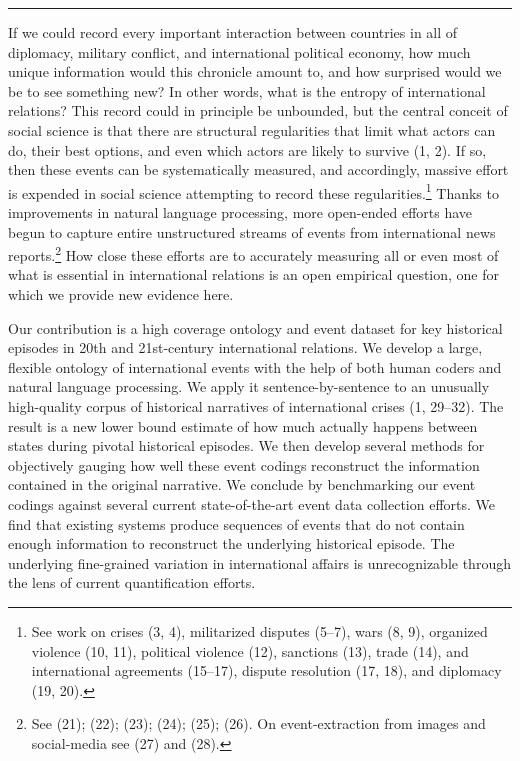 \documentclass{article}
\begin{document}
\begin{center}\rule{0.5\linewidth}{0.5pt}\end{center}

If we could record every important interaction between countries in all
of diplomacy, military conflict, and international political economy,
how much unique information would this chronicle amount to, and how
surprised would we be to see something new? In other words, what is the
entropy of international relations? This record could in principle be
unbounded, but the central conceit of social science is that there are
structural regularities that limit what actors can do, their best
options, and even which actors are likely to survive (1, 2). If so, then
these events can be systematically measured, and accordingly, massive
effort is expended in social science attempting to record these
regularities.\footnote{See work on crises (3, 4), militarized disputes
  (5--7), wars (8, 9), organized violence (10, 11), political violence
  (12), sanctions (13), trade (14), and international agreements
  (15--17), dispute resolution (17, 18), and diplomacy (19, 20).} Thanks
to improvements in natural language processing, more open-ended efforts
have begun to capture entire unstructured streams of events from
international news reports.\footnote{See (21); (22); (23); (24); (25);
  (26). On event-extraction from images and social-media see (27) and
  (28).} How close these efforts are to accurately measuring all or even
most of what is essential in international relations is an open
empirical question, one for which we provide new evidence here.

Our contribution is a high coverage ontology and event dataset for key
historical episodes in 20th and 21st-century international relations. We
develop a large, flexible ontology of international events with the help
of both human coders and natural language processing. We apply it
sentence-by-sentence to an unusually high-quality corpus of historical
narratives of international crises (1, 29--32). The result is a new
lower bound estimate of how much actually happens between states during
pivotal historical episodes. We then develop several methods for
objectively gauging how well these event codings reconstruct the
information contained in the original narrative. We conclude by
benchmarking our event codings against several current state-of-the-art
event data collection efforts. We find that existing systems produce
sequences of events that do not contain enough information to
reconstruct the underlying historical episode. The underlying
fine-grained variation in international affairs is unrecognizable
through the lens of current quantification efforts.
\end{document}
